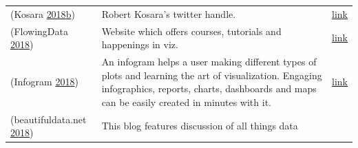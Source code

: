 \documentclass[]{book}
\theoremstyle{definition}
\theoremstyle{definition}
\theoremstyle{definition}
\theoremstyle{remark}
\begin{document}
\begin{longtable}[]{@{}lll@{}}
\begin{minipage}[t]{0.15\columnwidth}\raggedright\strut
(Kosara
\protect\hyperlink{ref-twitter_Kosara}{2018}\protect\hyperlink{ref-twitter_Kosara}{b})\strut
\end{minipage} & \begin{minipage}[t]{0.28\columnwidth}\raggedright\strut
Robert Kosara's twitter handle.\strut
\end{minipage} & \begin{minipage}[t]{0.48\columnwidth}\raggedright\strut
\href{https://twitter.com/eagereyes?lang=en}{link}\strut
\end{minipage}\tabularnewline
\begin{minipage}[t]{0.15\columnwidth}\raggedright\strut
(FlowingData \protect\hyperlink{ref-flowingdata}{2018})\strut
\end{minipage} & \begin{minipage}[t]{0.28\columnwidth}\raggedright\strut
Website which offers courses, tutorials and happenings in viz.\strut
\end{minipage} & \begin{minipage}[t]{0.48\columnwidth}\raggedright\strut
\href{http://flowingdata.com/}{link}\strut
\end{minipage}\tabularnewline
\begin{minipage}[t]{0.15\columnwidth}\raggedright\strut
(Infogram \protect\hyperlink{ref-infogram}{2018})\strut
\end{minipage} & \begin{minipage}[t]{0.28\columnwidth}\raggedright\strut
An infogram helps a user making different types of plots and learning
the art of visualization. Engaging infographics, reports, charts,
dashboards and maps can be easily created in minutes with it.\strut
\end{minipage} & \begin{minipage}[t]{0.48\columnwidth}\raggedright\strut
\href{https://infogram.com/}{link}\strut
\end{minipage}\tabularnewline
\begin{minipage}[t]{0.15\columnwidth}\raggedright\strut
(beautifuldata.net \protect\hyperlink{ref-data_beaut}{2018})\strut
\end{minipage} & \begin{minipage}[t]{0.28\columnwidth}\raggedright\strut
This blog features discussion of all things data\strut
\end{minipage} & \begin{minipage}[t]{0.48\columnwidth}\raggedright\strut

\end{minipage}
\end{longtable}
\end{document}
